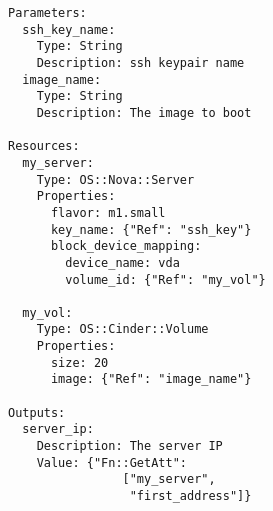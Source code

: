 \begin{verbatim}
Parameters:
  ssh_key_name:
    Type: String
    Description: ssh keypair name
  image_name:
    Type: String
    Description: The image to boot

Resources:
  my_server:
    Type: OS::Nova::Server
    Properties:
      flavor: m1.small
      key_name: {"Ref": "ssh_key"}
      block_device_mapping:
        device_name: vda
        volume_id: {"Ref": "my_vol"}

  my_vol:
    Type: OS::Cinder::Volume
    Properties:
      size: 20
      image: {"Ref": "image_name"}

Outputs:
  server_ip:
    Description: The server IP
    Value: {"Fn::GetAtt":
                ["my_server",
                 "first_address"]}
\end{verbatim}
